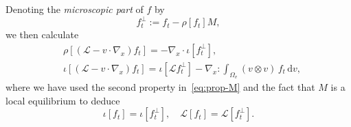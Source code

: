 \documentclass[11pt]{amsart}
\theoremstyle{definition}
\theoremstyle{remark}
\numberwithin{equation}{section}
\newcommand{\dd}{{\, \mathrm d}}
\begin{document}
Denoting the \emph{microscopic part} of $f$ by
\begin{equation}
  \label{eq:fperp-def}
  f^\bot_t := f_t - \rho[f_t] M,
\end{equation}
 we then calculate
\begin{align*}
  & \rho[(\mathcal L-v \cdot \nabla_x)f_t] = - \nabla_x \cdot \iota[f^\bot_t], \\
  & \iota[(\mathcal L-v \cdot \nabla_x)f_t] = \iota[\mathcal Lf^\bot_t] - \nabla_x : \int_{\Omega_v} (v \otimes v) \, f_t \dd v,
\end{align*}
where we have used the second property in~\eqref{eq:prop-M} and the fact that $M$ is a local equilibrium to deduce
\begin{equation}
  \label{eq:prop-Mbis}
  \iota[f_t] = \iota[f^\bot_t], \quad \mathcal L[f_t] = \mathcal L [f^\bot_t].
\end{equation}
\end{document}
